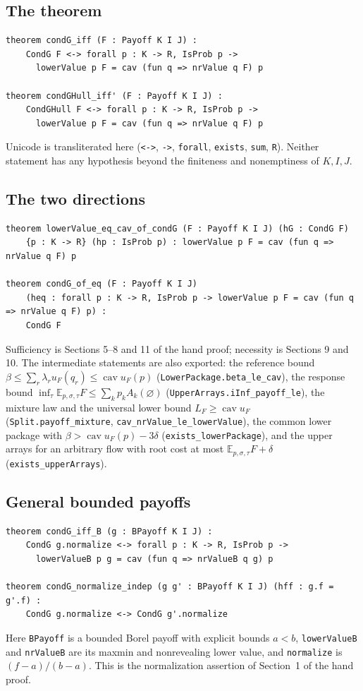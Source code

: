 \documentclass[11pt]{article}
\theoremstyle{definition}
\begin{document}
\subsection*{The theorem}
\begin{verbatim}
theorem condG_iff (F : Payoff K I J) :
    CondG F <-> forall p : K -> R, IsProb p ->
      lowerValue p F = cav (fun q => nrValue q F) p

theorem condGHull_iff' (F : Payoff K I J) :
    CondGHull F <-> forall p : K -> R, IsProb p ->
      lowerValue p F = cav (fun q => nrValue q F) p
\end{verbatim}
Unicode is transliterated here (\texttt{<->}, \texttt{->}, \texttt{forall}, \texttt{exists}, \texttt{sum}, \texttt{R}). Neither statement has any hypothesis beyond the finiteness and nonemptiness of $K,I,J$.

\subsection*{The two directions}
\begin{verbatim}
theorem lowerValue_eq_cav_of_condG (F : Payoff K I J) (hG : CondG F)
    {p : K -> R} (hp : IsProb p) : lowerValue p F = cav (fun q => nrValue q F) p

theorem condG_of_eq (F : Payoff K I J)
    (heq : forall p : K -> R, IsProb p -> lowerValue p F = cav (fun q => nrValue q F) p) :
    CondG F
\end{verbatim}
Sufficiency is Sections 5--8 and 11 of the hand proof; necessity is Sections 9 and 10. The intermediate statements are also exported: the reference bound $\beta\le\sum_r\lambda_ru_F(q_r)\le\operatorname{cav}u_F(p)$ (\texttt{LowerPackage.beta\_le\_cav}), the response bound $\inf_\tau\mathbb E_{p,\sigma,\tau}F\le\sum_kp_kA_k(\varnothing)$ (\texttt{UpperArrays.iInf\_payoff\_le}), the mixture law and the universal lower bound $L_F\ge\operatorname{cav}u_F$ (\texttt{Split.payoff\_mixture}, \texttt{cav\_nrValue\_le\_lowerValue}), the common lower package with $\beta>\operatorname{cav}u_F(p)-3\delta$ (\texttt{exists\_lowerPackage}), and the upper arrays for an arbitrary flow with root cost at most $\mathbb E_{p,\sigma,\tau}F+\delta$ (\texttt{exists\_upperArrays}).

\subsection*{General bounded payoffs}
\begin{verbatim}
theorem condG_iff_B (g : BPayoff K I J) :
    CondG g.normalize <-> forall p : K -> R, IsProb p ->
      lowerValueB p g = cav (fun q => nrValueB q g) p

theorem condG_normalize_indep (g g' : BPayoff K I J) (hff : g.f = g'.f) :
    CondG g.normalize <-> CondG g'.normalize
\end{verbatim}
Here \texttt{BPayoff} is a bounded Borel payoff with explicit bounds $a<b$, \texttt{lowerValueB} and \texttt{nrValueB} are its maxmin and nonrevealing lower value, and \texttt{normalize} is $(f-a)/(b-a)$. This is the normalization assertion of Section~1 of the hand proof.
\end{document}
